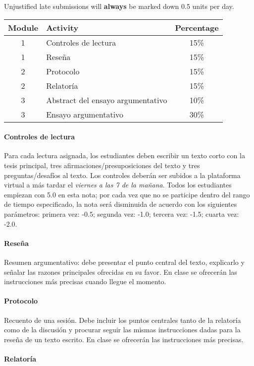 \documentclass[]{article}
\let\oldparagraph\paragraph
\renewcommand{\paragraph}[1]{\oldparagraph{#1}\mbox{}}
\begin{document}
Unjustified late submissions will \textbf{always} be marked down 0.5 units per day.

\begin{longtable}[]{@{}clc@{}}
\toprule
Module & Activity & Percentage\tabularnewline
\midrule
\endhead
1 & Controles de lectura & 15\%\tabularnewline
1 & Reseña & 15\%\tabularnewline
2 & Protocolo & 15\%\tabularnewline
2 & Relatoría & 15\%\tabularnewline
3 & Abstract del ensayo argumentativo & 10\%\tabularnewline
3 & Ensayo argumentativo & 30\%\tabularnewline
\bottomrule
\end{longtable}

\paragraph{Controles de lectura}\label{controles-de-lectura}

Para cada lectura asignada, los estudiantes deben escribir un texto
corto con la tesis principal, tres afirmaciones/presuposiciones del
texto y tres preguntas/desafíos al texto. Los controles deberán ser
subidos a la plataforma virtual a más tardar el \emph{viernes a las 7 de
la mañana}. Todos los estudiantes empiezan con 5.0 en esta nota; por
cada vez que no se participe dentro del rango de tiempo especificado, la
nota será disminuida de acuerdo con los siguientes parámetros: primera
vez: -0.5; segunda vez: -1.0; tercera vez: -1.5; cuarta vez: -2.0.

\paragraph{Reseña}\label{reseuxf1a}

Resumen argumentativo: debe presentar el punto central del texto,
explicarlo y señalar las razones principales ofrecidas en su favor. En
clase se ofrecerán las instrucciones más precisas cuando llegue el
momento.

\paragraph{Protocolo}\label{protocolo}

Recuento de una sesión. Debe incluir los puntos centrales tanto de la
relatoría como de la discusión y  procurar seguir las mismas
instrucciones dadas para la reseña de un texto escrito. En clase se
ofrecerán las instrucciones más precisas.

\paragraph{Relatoría}\label{relatoruxeda}
\end{document}
